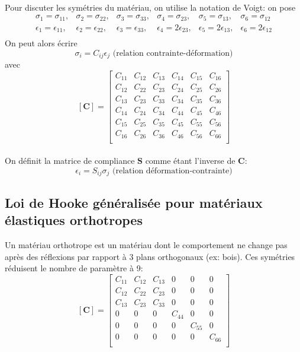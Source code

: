\paragraph{}
Pour discuter les symétries du matériau, on utilise la notation de Voigt: on pose
$$\begin{array}{cccccc}
\sigma_1=\sigma_{11},&\sigma_2=\sigma_{22},&\sigma_3=\sigma_{33},&\sigma_4=\sigma_{23},&\sigma_5=\sigma_{13},&\sigma_6=\sigma_{12}\\
\epsilon_1=\epsilon_{11},&\epsilon_2=\epsilon_{22},&\epsilon_3=\epsilon_{33},&\epsilon_4=2\epsilon_{23},&\epsilon_5=2\epsilon_{13},&\epsilon_6=2\epsilon_{12}\\
\end{array}$$
On peut alors écrire $$\boxed{\sigma_i=C_{ij}\epsilon_{j}\text{ (relation contrainte-déformation)}}$$ avec 
$$[\textbf{C}]=
\left[
\begin{array}{cccccc}
C_{11}&C_{12}&C_{13}&C_{14}&C_{15}&C_{16}\\
C_{12}& C_{22}&C_{23}&C_{24}&C_{25}&C_{26}\\
C_{13}&C_{23} &C_{33}&C_{34}&C_{35}&C_{36}\\
C_{14}&C_{24}&C_{34} &C_{44}&C_{45}&C_{46}\\
C_{15}&C_{25} &C_{35} &C_{45} &C_{55}&C_{56}\\
C_{16}&C_{26} &C_{36}&C_{46} &C_{56}&C_{66}\\
\end{array}\right]$$
\paragraph{}
On définit la matrice de compliance $\textbf{S}$ comme étant l'inverse de $\textbf{C}$: $$\boxed{\epsilon_{i}=S_{ij}\sigma_j \text{ (relation déformation-contrainte)}}$$
\subsection{Loi de Hooke généralisée pour matériaux élastiques orthotropes}
Un matériau orthotrope est un matériau dont le comportement ne change pas après des réflexions par rapport à 3 plans orthogonaux (ex: bois). Ces symétries réduisent le nombre de paramètre à 9:
$$[\textbf{C}]=
\left[
\begin{array}{cccccc}
C_{11}&C_{12}&C_{13}&0&0&0\\
C_{12}& C_{22}&C_{23}&0&0&0\\
C_{13}&C_{23} &C_{33}&0&0&0\\
0&0&0 &C_{44}&0&0\\
0&0 &0 &0 &C_{55}&0\\
0&0 &0&0 &0&C_{66}\\
\end{array}\right]$$

